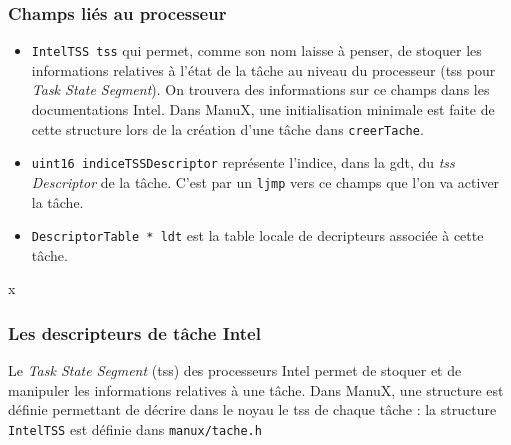 %
\subsubsection{Champs liés au processeur}

\begin{itemize}
   \item \lstinline!IntelTSS tss! qui permet, comme son nom laisse à
penser, de stoquer les informations relatives à l'état de la tâche au
niveau du processeur ({\sc tss} pour {\em Task State Segment}). On
trouvera des informations sur ce champs dans les documentations Intel.
Dans ManuX, une initialisation minimale est faite de cette structure
lors de la création d'une tâche dans \lstinline!creerTache!.

   \item \lstinline!uint16 indiceTSSDescriptor! représente l'indice,
dans la {\sc gdt}, du {\em {\sc tss} Descriptor} de la tâche. C'est
par un \lstinline!ljmp! vers ce champs que l'on va activer la tâche.

   \item \lstinline!DescriptorTable * ldt! est la table locale de
decripteurs associée à cette tâche.
\end{itemize}

%
x
%
\subsubsection{Les descripteurs de tâche Intel}

   Le {\em Task State Segment} ({\sc tss}) des processeurs Intel
permet de stoquer et de manipuler les informations relatives à une
tâche. Dans ManuX, une structure est définie permettant de décrire
dans le noyau le {\sc tss} de chaque tâche : la structure
\lstinline!IntelTSS! est définie dans
\lstinline!manux/tache.h!

